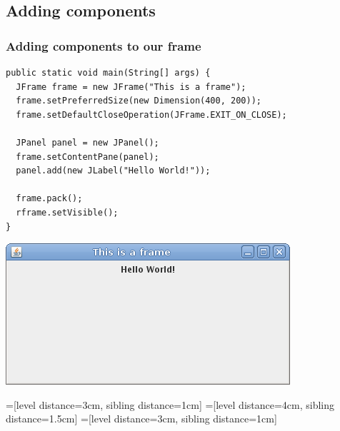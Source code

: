 \documentclass[10pt, handout]{beamer}
\begin{document}
\subsection{Adding components}
\begin{frame}[fragile]
  \frametitle{Adding components to our frame}
  \begin{verbatim}
public static void main(String[] args) {
  JFrame frame = new JFrame("This is a frame");
  frame.setPreferredSize(new Dimension(400, 200));
  frame.setDefaultCloseOperation(JFrame.EXIT_ON_CLOSE);

  JPanel panel = new JPanel();
  frame.setContentPane(panel);
  panel.add(new JLabel("Hello World!"));

  frame.pack();
  rframe.setVisible();
}
\end{verbatim}
\begin{center}
\includegraphics[width=0.6\linewidth]{label}
\end{center}
\end{frame}

=[level distance=3cm, sibling distance=1cm]
=[level distance=4cm, sibling distance=1.5cm]
=[level distance=3cm, sibling distance=1cm]
\end{document}
